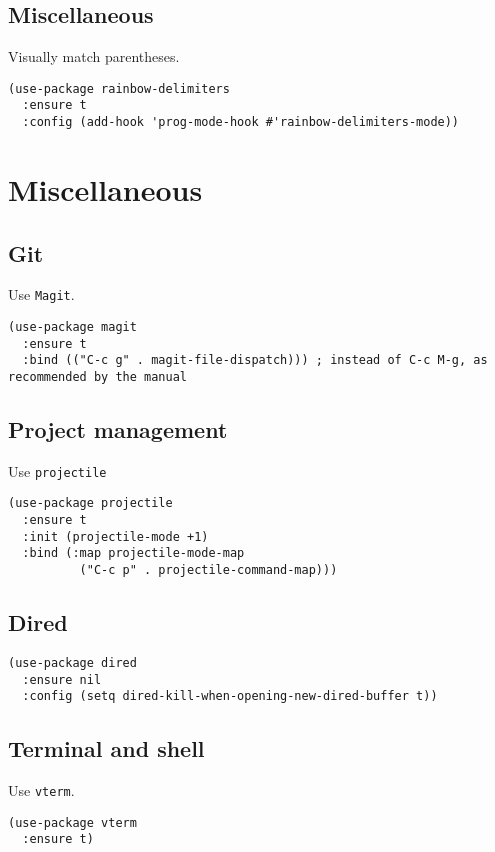 \documentclass[a4paper,11pt]{article}
\begin{document}
\subsection{Miscellaneous}
\label{sec:org3763556}
Visually match parentheses.
\begin{verbatim}
(use-package rainbow-delimiters
  :ensure t
  :config (add-hook 'prog-mode-hook #'rainbow-delimiters-mode))
\end{verbatim}

\section{Miscellaneous}
\label{sec:org6ec1d87}
\subsection{Git}
\label{sec:orga5b4322}
Use \texttt{Magit}.
\begin{verbatim}
(use-package magit
  :ensure t
  :bind (("C-c g" . magit-file-dispatch))) ; instead of C-c M-g, as recommended by the manual
\end{verbatim}

\subsection{Project management}
\label{sec:org2feab71}
Use \texttt{projectile}
\begin{verbatim}
(use-package projectile
  :ensure t
  :init (projectile-mode +1)
  :bind (:map projectile-mode-map
	      ("C-c p" . projectile-command-map)))
\end{verbatim}

\subsection{Dired}
\label{sec:org758dc23}
\begin{verbatim}
(use-package dired
  :ensure nil
  :config (setq dired-kill-when-opening-new-dired-buffer t))
\end{verbatim}

\subsection{Terminal and shell}
\label{sec:orga7d15e0}
Use \texttt{vterm}.
\begin{verbatim}
(use-package vterm
  :ensure t)
\end{verbatim}
\end{document}
